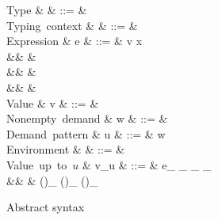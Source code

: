 \begin{figure}
\begin{syntaxfig}
\mbox{Type}
&
\tau
&
::=
&
\tyUnit
\mid
\tyPrim
\mid
{}
\mid
{}
\mid
{}
\mid
\tyRec{\alpha}{\tau}
\mid
\tyVar{\alpha}
\\[1mm]
\mbox{Typing context}
&
\Gamma
&
::=
&
\cxtEmpty
\mid
{}
\\[1mm]
\mbox{Expression}
&
e
&
::=
&
v
\mid
x
\mid
\exUnit
\mid
\exConst
\mid
{}
\mid
{}
\mid
{}
\\
&&
\mid
&
\mid
{}
\mid
{}
\mid
{}
\mid
{}
\\
&&
\mid
&
\\
&&
\mid
&
\mid
{}
\\[1mm]
\mbox{Value}
&
v
&
::=
&
\exUnit
\mid
\exConst
\mid
{}
\mid
{}
\mid
{}
\mid
{}
\mid
{}
\\[1mm]
\mbox{Nonempty demand}
&
w
&
::=
&
\hnf
\mid
{}
\mid
{}
\mid
{}
\mid
{}
\\[1mm]
\mbox{Demand pattern}
&
u
&
::=
&
\hole
\mid
w
\\[1mm]
\mbox{Environment}
&
\rho
&
::=
&
\envEmpty
\mid
{}
\\[1mm]
\mbox{Value up to $u$}
&
v_u
&
::=
&
e_{\hole}
\mid
\exUnit_{\hnf}
\mid
\exConst_{\hnf}
\mid
{}_{}
\\
&&
\mid
&
()_{}
\mid
()_{}
\mid
()_{}
\end{syntaxfig}
\caption{Abstract syntax}
\label{fig:syntax:values}
\end{figure}
